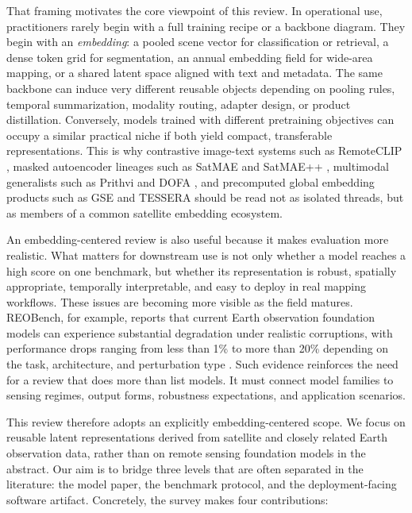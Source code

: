 That framing motivates the core viewpoint of this review. In operational use, practitioners rarely begin with a full training recipe or a backbone diagram. They begin with an \emph{embedding}: a pooled scene vector for classification or retrieval, a dense token grid for segmentation, an annual embedding field for wide-area mapping, or a shared latent space aligned with text and metadata. The same backbone can induce very different reusable objects depending on pooling rules, temporal summarization, modality routing, adapter design, or product distillation. Conversely, models trained with different pretraining objectives can occupy a similar practical niche if both yield compact, transferable representations. This is why contrastive image-text systems such as RemoteCLIP \citep{remoteclip}, masked autoencoder lineages such as SatMAE and SatMAE++ \citep{satmae,satmaepp}, multimodal generalists such as Prithvi and DOFA \citep{prithvi,dofa}, and precomputed global embedding products such as GSE and TESSERA \citep{gse,tessera} should be read not as isolated threads, but as members of a common satellite embedding ecosystem.

An embedding-centered review is also useful because it makes evaluation more realistic. What matters for downstream use is not only whether a model reaches a high score on one benchmark, but whether its representation is robust, spatially appropriate, temporally interpretable, and easy to deploy in real mapping workflows. These issues are becoming more visible as the field matures. REOBench, for example, reports that current Earth observation foundation models can experience substantial degradation under realistic corruptions, with performance drops ranging from less than 1\% to more than 20\% depending on the task, architecture, and perturbation type \citep{reobench}. Such evidence reinforces the need for a review that does more than list models. It must connect model families to sensing regimes, output forms, robustness expectations, and application scenarios.

This review therefore adopts an explicitly embedding-centered scope. We focus on reusable latent representations derived from satellite and closely related Earth observation data, rather than on remote sensing foundation models in the abstract. Our aim is to bridge three levels that are often separated in the literature: the model paper, the benchmark protocol, and the deployment-facing software artifact. Concretely, the survey makes four contributions:

